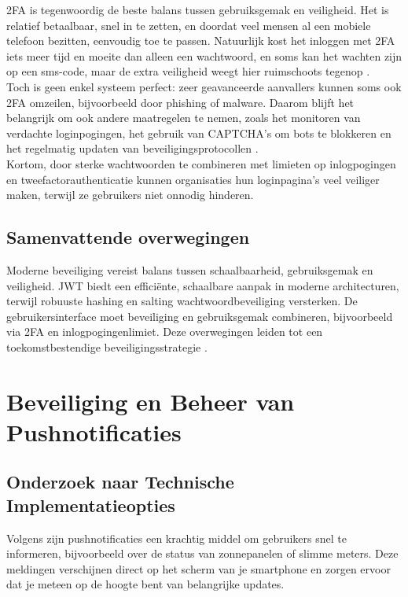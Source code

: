 2FA is tegenwoordig de beste balans tussen gebruiksgemak en veiligheid. Het is relatief betaalbaar, snel in te zetten, en doordat veel mensen al een mobiele telefoon bezitten, eenvoudig toe te passen. Natuurlijk kost het inloggen met 2FA iets meer tijd en moeite dan alleen een wachtwoord, en soms kan het wachten zijn op een sms-code, maar de extra veiligheid weegt hier ruimschoots tegenop \autocite{Jurisons2024}.\\

Toch is geen enkel systeem perfect: zeer geavanceerde aanvallers kunnen soms ook 2FA omzeilen, bijvoorbeeld door phishing of malware. Daarom blijft het belangrijk om ook andere maatregelen te nemen, zoals het monitoren van verdachte loginpogingen, het gebruik van CAPTCHA’s om bots te blokkeren en het regelmatig updaten van beveiligingsprotocollen \autocite{Chinnasamy2025}.\\

Kortom, door sterke wachtwoorden te combineren met limieten op inlogpogingen en tweefactorauthenticatie kunnen organisaties hun loginpagina’s veel veiliger maken, terwijl ze gebruikers niet onnodig hinderen.\\

\subsection{Samenvattende overwegingen}
Moderne beveiliging vereist balans tussen schaalbaarheid, gebruiksgemak en veiligheid. JWT biedt een efficiënte, schaalbare aanpak in moderne architecturen, terwijl robuuste hashing en salting wachtwoordbeveiliging versterken. De gebruikersinterface moet beveiliging en gebruiksgemak combineren, bijvoorbeeld via 2FA en inlogpogingenlimiet. Deze overwegingen leiden tot een toekomstbestendige beveiligingsstrategie \autocite{Gao2023, Gupta2022, Arias2025, ReesCarter2024, Chinnasamy2025, Jurisons2024}.

\section{Beveiliging en Beheer van Pushnotificaties}

\subsection{Onderzoek naar Technische Implementatieopties}
Volgens \textcite{Wohllebe2021} zijn pushnotificaties een krachtig middel om gebruikers snel te informeren, bijvoorbeeld over de status van zonnepanelen of slimme meters. Deze meldingen verschijnen direct op het scherm van je smartphone en zorgen ervoor dat je meteen op de hoogte bent van belangrijke updates.\\

